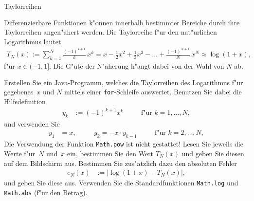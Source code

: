 \begin{exercise}{Taylorreihen}
\begin{body}
Differenzierbare Funktionen k"onnen innerhalb bestimmter Bereiche durch ihre Taylorreihen angen"ahert werden.
Die Taylor\-reihe f"ur den nat"urlichen Logarithmus lautet
\begin{align*}
T_N(x) := \sum_{k=1}^N \frac{(-1)^{k+1}}{k}\, x^k
        =x-\frac{1}{2}x^2+\frac{1}{3}x^3- \ldots +  \frac{(-1)^{N+1}}{N}\, x^N
        \approx \log(1+x),
\end{align*}
f"ur $x\in (-1,1]$.
Die G"ute der N"aherung h"angt dabei von der Wahl von $N$ ab.

Erstellen Sie ein Java-Programm, welches die Taylorreihen des Logarithmus f"ur gegebenes~$x$ und $N$ mittels einer \verb+for+-Schleife auswertet.
Benutzen Sie dabei die Hilfsdefinition
\begin{align*}
y_k&:=(-1)^{k+1} x^k \quad      &&\mbox{f"ur } k=1,\ldots,N,
\end{align*}
und verwenden Sie
\begin{align*}
y_1&=x,\quad && y_k=-x\cdot y_{k-1}   \quad &&\mbox{f"ur } k=2,\ldots,N,
\end{align*}
Die Verwendung der Funktion {\tt Math.pow}  ist nicht gestattet!
Lesen Sie jeweils die Werte f"ur~$N$ und~$x$ ein, bestimmen Sie den Wert $T_N(x)$ und geben Sie diesen auf dem Bildschirm aus.
Bestimmen Sie zus"atzlich dazu den absoluten Fehler
\begin{align*}
e_N(x)&:=\left|\log(1+x)-T_N(x)\right|,
\end{align*}
und geben Sie diese aus.
Verwenden Sie die Standardfunktionen \verb+Math.log+ und \verb+Math.abs+ (f"ur den Betrag).
\end{body}

\begin{solution}
\end{solution}
\end{exercise}
